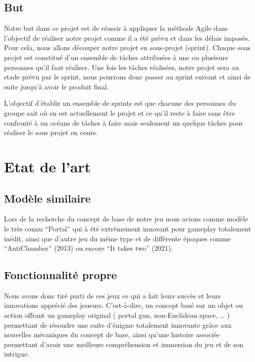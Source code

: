 \documentclass[a4paper,11pt]{article}
\begin{document}
\subsection{But}

Notre but dans ce projet est de réussir à appliquer la méthode Agile dans l’objectif 
de réaliser notre projet comme il a été prévu et dans les délais imposés.
Pour cela, nous allons découper notre projet en sous-projet (sprint).
Chaque sous projet est constitué d’un ensemble de tâches attribuées à une ou plusieurs 
personnes qu’il faut réaliser. Une fois les tâches réalisées, notre projet sera au stade 
prévu par le sprint, nous pourrons donc passer au sprint suivant et ainsi de suite jusqu’à avoir le produit final.\newline

L'objectif d’établir un ensemble de sprints est que chacune des personnes du groupe sait 
où en est actuellement le projet et ce qu’il reste à faire sans être confronté à un océans de 
tâches à faire mais seulement un quelque tâches pour réaliser le sous projet en cours.


\section{Etat de l’art}

\subsection{Modèle similaire}

Lors de la recherche du concept de base de notre jeu nous avions comme modèle le très connu “Portal” 
qui à été extrêmement innovant pour gameplay totalement inédit, ainsi que d’autre jeu du même type et 
de différente époques comme “AntiChamber” (2013) ou encore “It takes two” (2021). 

\subsection{Fonctionnalité propre}

Nous avons donc tiré parti de ces jeux ce qui a fait leurs succès et leurs innovations apprécié des joueurs. C’est-à-dire, 
un concept basé sur un objet ou action offrant un gameplay original ( portal gun, non-Euclidean space, … ) permettant de résoudre 
une suite d'énigme totalement innovante grâce aux nouvelles mécaniques du concept de base, ainsi qu’une 
histoire associée permettant d’avoir une meilleure compréhension et immersion du jeu et de son intrigue.
\end{document}

